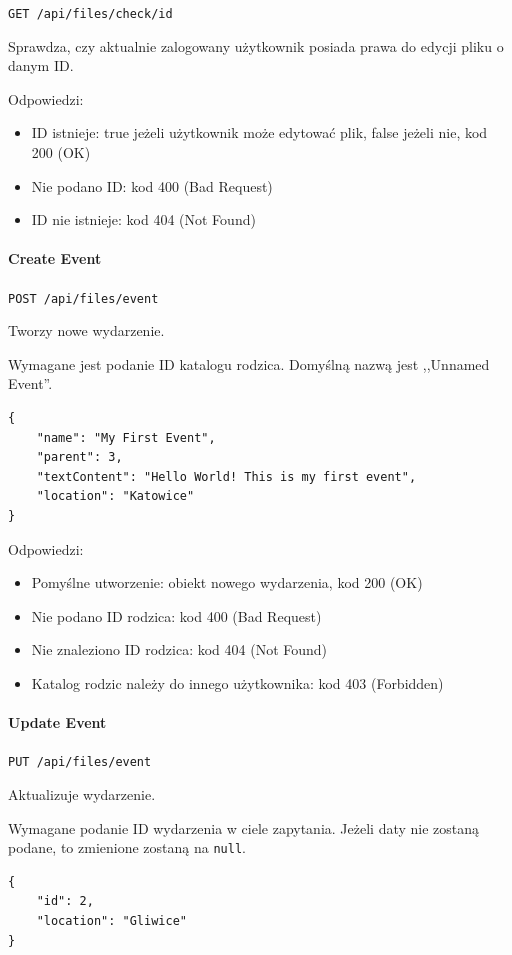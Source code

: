 \documentclass[a4paper,twoside,12pt]{book}
\begin{document}
\texttt{GET /api/files/check/{id}}

Sprawdza, czy aktualnie zalogowany użytkownik posiada prawa do edycji pliku o danym ID.

Odpowiedzi: 
\begin{itemize}
	\item ID istnieje: true jeżeli użytkownik może edytować plik, false jeżeli nie, kod 200 (OK) 
	\item  Nie podano ID: kod 400 (Bad Request) 
	\item ID nie istnieje: kod 404 (Not Found)
\end{itemize}

\paragraph{Create Event}

\texttt{POST /api/files/event}

Tworzy nowe wydarzenie.

Wymagane jest podanie ID katalogu rodzica. Domyślną nazwą jest ,,Unnamed Event''.

\begin{verbatim}
{
    "name": "My First Event",
    "parent": 3,
    "textContent": "Hello World! This is my first event",
    "location": "Katowice"
}
\end{verbatim}

Odpowiedzi: 
\begin{itemize}
	\item Pomyślne utworzenie: obiekt nowego wydarzenia, kod 200 (OK) 
	\item Nie podano ID rodzica: kod 400 (Bad Request)
	\item Nie znaleziono ID rodzica: kod 404 (Not Found) 
	\item Katalog rodzic należy do innego użytkownika: kod 403 (Forbidden)
\end{itemize}

\paragraph{Update Event}

\texttt{PUT /api/files/event}

Aktualizuje wydarzenie.

Wymagane podanie ID wydarzenia w ciele zapytania. Jeżeli daty nie zostaną podane, to zmienione zostaną na \texttt{null}.

\begin{verbatim}
{
    "id": 2,
    "location": "Gliwice"
}
\end{verbatim}
\end{document}
